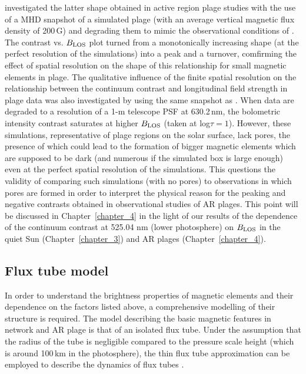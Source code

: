 \documentclass[goettingen, gauss, print]{thesis}
\begin{document}
\cite{danilovic_relation_2013} investigated the latter shape obtained in active region plage studies with the use of a MHD snapshot of a simulated plage (with an average vertical magnetic flux density of 200\,G) and degrading them to mimic the observational conditions of \cite{kobel_continuum_2011}.
The contrast vs. $B_{\rm LOS}$ plot turned from a monotonically increasing shape (at the perfect resolution of the simulations) into a peak and a turnover, comfirming the effect of spatial resolution on the shape of this relationship for small magnetic elements in plage. The qualitative influence of the finite spatial resolution on the relationship between the continuum contrast and longitudinal field strength in plage data was also investigated by \cite{rohrbein_is_2011} using the same snapshot as \cite{danilovic_relation_2013}. When data are degraded to a resolution of a 1-m telescope PSF at 630.2\,nm, the bolometric intensity contrast saturates at higher $B_{\rm LOS}$ (taken at log$\tau=1$).
However, these simulations, representative of plage regions on the solar surface, lack pores, the presence of which could lead to the formation of bigger magnetic elements which are supposed to be dark (and numerous if the simulated box is large enough) even at the perfect spatial resolution of the simulations. This questions the validity of comparing such simulations (with no pores) to observations in which pores are formed in order to interpret the physical reason for the peaking and negative contrasts obtained in observational studies of AR plages.
This point will be discussed in Chapter~\ref{chapter_4} in the light of our results of the dependence of the continuum contrast at 525.04 nm (lower photosphere) on $B_{\rm LOS}$ in the quiet Sun (Chapter~\ref{chapter_3}) and AR plages (Chapter~\ref{chapter_4}).




\subsection{Flux tube model}
\label{intro_flux_tubes}
In order to understand the brightness properties of magnetic elements and their dependence on the factors listed above, a comprehensive modelling of their structure is required.
The model describing the basic magnetic features in network and AR plage is that of an isolated flux tube. Under the assumption that the radius of the tube is negligible compared to the pressure scale height (which is around 100\,km in the photosphere), the thin flux tube approximation can be employed to describe the dynamics of flux tubes \citep{spruit_equations_1981}.
\end{document}
